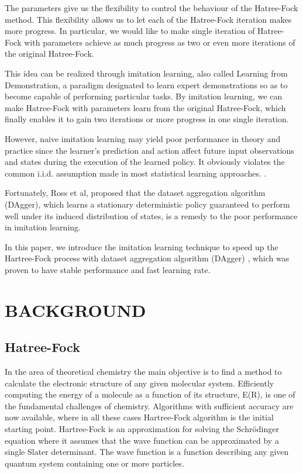 \documentclass[twoside]{article}
\begin{document}
The parameters give us the flexibility to control the behaviour of the Hatree-Fock method. This flexibility allows us to let each of the Hatree-Fock iteration makes more progress. In particular, we would like to make single iteration of Hatree-Fock with parameters achieve as much progress as two or even more iterations of the original Hatree-Fock.


This idea can be realized through imitation learning, also called Learning from Demonstration, a paradigm designated to learn expert demonstrations so as to become capable of performing particular tasks. By imitation learning, we can make Hatree-Fock with parameters learn from the original Hatree-Fock, which finally enables it to gain two iterations or more progress in one single iteration.


However, naive imitation learning may yield poor performance in theory and practice since the learner's prediction and action affect future input observations and states during the execution of the learned policy. It obviously violates the common i.i.d. assumption made in most statistical learning approaches. \cite{Ross}.


Fortunately, Ross et al,\cite{DAgger} proposed that the dataset aggregation algorithm (DAgger), which learns a stationary deterministic policy guaranteed to perform well under its induced distribution of states, is a remedy to the poor performance in imitation learning.


In this paper,  we introduce the imitation learning technique to speed up the Hartree-Fock process with dataset aggregation algorithm (DAgger) \cite{DAgger}, which was proven to have stable performance and fast learning rate. \cite{DAggerCompare}


\section{BACKGROUND}

\subsection{Hatree-Fock}

In the area of theoretical chemistry the main objective is to find a method to calculate the electronic structure of any given molecular system. Efficiently computing the energy of a molecule as a function of its structure, E(R), is one of the fundamental challenges of chemistry. Algorithms with sufficient accuracy are now available, where in all these cases Hartree-Fock algorithm is the initial starting point. Hartree-Fock is an approximation for solving the Schrödinger equation where it assumes that the wave function can be approximated by a single Slater determinant.  The wave function is a function describing any given quantum system containing one or more particles. 
\end{document}
